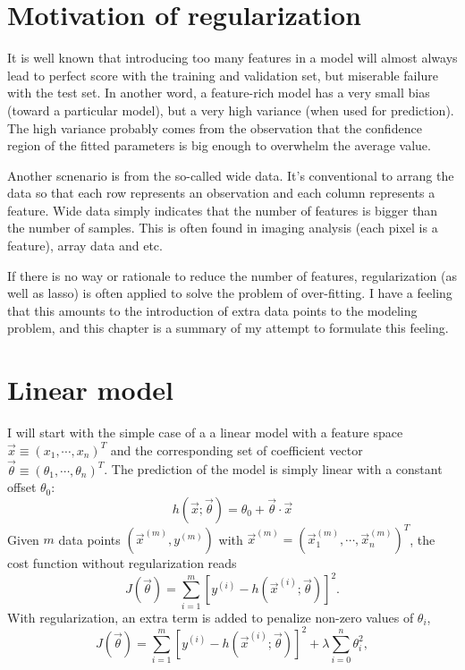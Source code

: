 \section{Motivation of regularization}
It is well known that introducing too many features in a model will almost always lead to perfect score with the training and validation set, 
but miserable failure with the test set. In another word, a feature-rich model has a very small bias (toward a particular model), but a very 
high variance (when used for prediction). The high variance probably comes from the observation that the confidence region of the fitted 
parameters is big enough to overwhelm the average value.

Another scnenario is from the so-called wide data. It's conventional to arrang the data so that each row represents
an observation and each column represents a feature. Wide data simply indicates that the number of features is bigger
than the number of samples. This is often found in imaging analysis (each pixel is a feature), array data and etc.


If there is no way or rationale to reduce the number of features, regularization (as well as lasso) is often applied to solve the problem of over-fitting. 
I have a feeling that this amounts to the introduction of extra data points to the modeling problem, and this chapter is a summary of my 
attempt to formulate this feeling.

\section{Linear model}
I will start with the simple case of a a linear model with a feature space $\vec x \equiv(x_1, \cdots, x_n)^T$ and the corresponding set of coefficient 
vector $\vec\theta\equiv(\theta_1, \cdots, \theta_n)^T$. The prediction of the model is simply linear with a constant offset $\theta_0$:
\begin{equation}
h(\vec x;\vec\theta) = \theta_0 + \vec\theta\cdot\vec x
\end{equation}
Given $m$ data points $(\vec x^{(m)}, y^{(m)})$ with $\vec x^{(m)} = (\vec x_1^{(m)}, \cdots, \vec x_n^{(m)})^T$, the cost function without regularization reads
\begin{equation}
J(\vec\theta) = \sum_{i=1}^{m}\left[y^{(i)}-h(\vec x^{(i)};\vec\theta)\right]^2.
\end{equation}
With regularization, an extra term is added to penalize non-zero values of $\theta_i$,
\begin{equation}
J(\vec\theta) = \sum_{i=1}^{m}\left[y^{(i)}-h(\vec x^{(i)};\vec\theta)\right]^2 + \lambda\sum_{i=0}^{n}\theta_i^2,
\end{equation}

